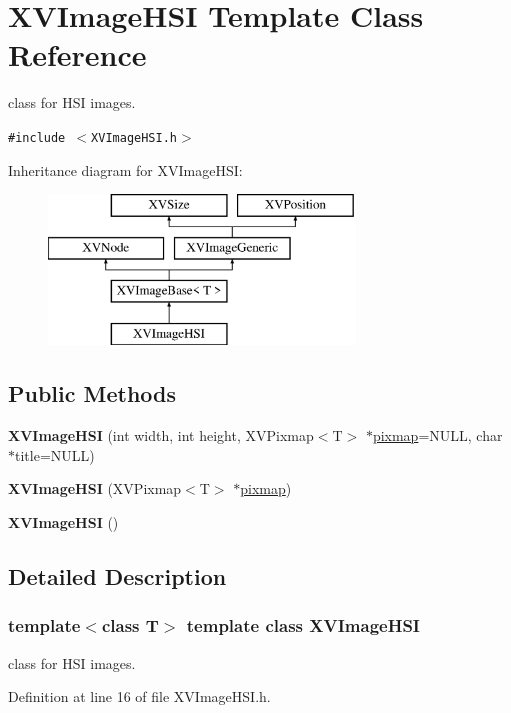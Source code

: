 \hypertarget{class_XVImageHSI}{
\section{XVImage\-HSI  Template Class Reference}
\label{XVImageHSI}
}
class for HSI images. 


{\tt \#include $<$XVImage\-HSI.h$>$}

Inheritance diagram for XVImage\-HSI:\begin{figure}[H]
\begin{center}
\leavevmode
\includegraphics[height=4cm]{class_XVImageHSI}
\end{center}
\end{figure}
\subsection*{Public Methods}
\begin{CompactItemize}
\item 
{\bf XVImage\-HSI} (int width, int height, XVPixmap$<$T$>$ $\ast$\hyperlink{class_XVImageBase_n1}{pixmap}=NULL, char $\ast$title=NULL)
\item 
{\bf XVImage\-HSI} (XVPixmap$<$T$>$ $\ast$\hyperlink{class_XVImageBase_n1}{pixmap})
\item 
{\bf XVImage\-HSI} ()
\end{CompactItemize}


\subsection{Detailed Description}
\subsubsection*{template$<$class T$>$  template class XVImage\-HSI}

class for HSI images.





Definition at line 16 of file XVImage\-HSI.h.

